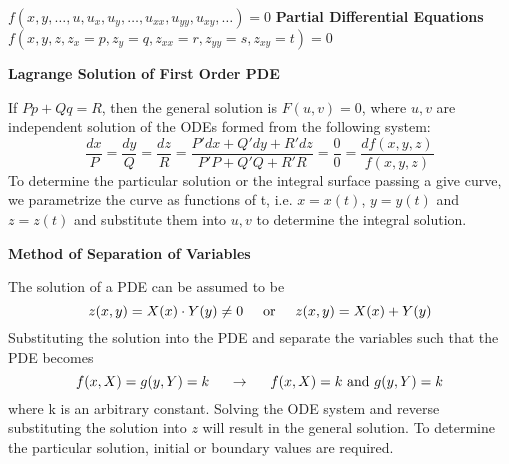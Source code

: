 \documentclass{article}
\begin{document}
\thispagestyle{empty}

\begin{tcolorbox}[colframe=SeaGreen, colback=SeaGreen!20]
	\begin{center} \begin{huge}
			$f(x,y, \dots, u, u_x, u_y, \dots, u_{xx}, u_{yy}, u_{xy}, \dots) = 0$ \hspace{2cm}
			\textbf{Partial Differential Equations} \hspace{2cm}
			$f(x,y,z,z_x=p,z_y=q,z_{xx}=r,z_{yy}=s,z_{xy}=t) = 0$
		\end{huge} \end{center}
\end{tcolorbox}
	
\begin{tcbraster}[raster equal height,raster valign=top,raster columns=2, raster rows=1]
	\begin{tcolorbox}[colframe=SeaGreen, colback=SeaGreen!15, height=9cm, width = 25cm,title=\begin{center} \begin{Large} \textbf{Solutions of PDEs} \end{Large} \end{center}]
		
		\begin{center} \textbf{Lagrange Solution of First Order PDE} \end{center}
		If $Pp + Qq = R$, then the general solution is $F(u,v) = 0$, where $u,v$ are independent solution of the ODEs formed from the following system:
		$$\frac{dx}{P} = \frac{dy}{Q} = \frac{dz}{R} = \frac{P'dx+Q'dy+R'dz}{P'P+Q'Q+R'R} = \frac{0}{0} = \frac{df(x,y,z)}{f(x,y,z)}$$
		To determine the particular solution or the integral surface passing a give curve, we parametrize the curve as functions of t, i.e. $x=x(t)$, $y=y(t)$ and $z=z(t)$ and substitute them into $u,v$ to determine the integral solution.
		
		\tcblower
		
		\begin{center} \textbf{Method of Separation of Variables} \end{center}
		The solution of a PDE can be assumed to  be
		$$z(x,y) = X(x) \cdot Y(y)\not = 0 \hspace{0.5cm} \text{or} \hspace{0.5cm} z(x,y) = X(x) + Y(y)$$
		Substituting the solution into the PDE and separate the variables such that the PDE becomes
		$$f(x,X) =g(y,Y) = k \hspace{0.5cm} \rightarrow \hspace{0.5cm} f(x,X) = k  \text{ and } g(y,Y) = k$$
		where k is an arbitrary constant. Solving the ODE system and reverse substituting the solution into $z$ will result in the general solution. To determine the particular solution, initial or boundary values are required. 
		

\end{tcolorbox}
\end{tcbraster}
\end{document}
